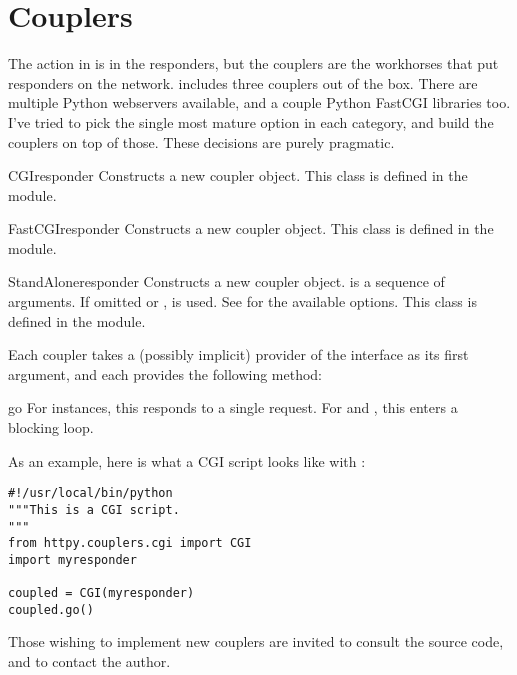 \section{Couplers \label{couplers}}

The action in  is in the responders, but the couplers are the
workhorses that put responders on the network.  includes three
couplers out of the box. There are multiple Python webservers available, and a
couple Python FastCGI libraries too. I've tried to pick the single most mature
option in each category, and build the couplers on top of those. These decisions
are purely pragmatic.

\begin{classdesc}{CGI}{responder} Constructs a new  coupler object.
This class is defined in the  module.
\end{classdesc}

\begin{classdesc}{FastCGI}{responder} Constructs a new  coupler
object. This class is defined in the  module.
\end{classdesc}

\begin{classdesc}{StandAlone}{responder} Constructs a new
 coupler object.  is a sequence of arguments. If
omitted or ,  is used. See  for the available options. This class
is defined in the  module. \end{classdesc}

Each coupler takes a (possibly implicit) provider of the 
interface as its first argument, and each provides the following method:

\begin{methoddesc}{go}{} For  instances, this responds to a single
request. For  and , this enters a blocking
loop.\end{methoddesc}

As an example, here is what a CGI script looks like with :

\begin{verbatim}
#!/usr/local/bin/python
"""This is a CGI script.
"""
from httpy.couplers.cgi import CGI
import myresponder

coupled = CGI(myresponder)
coupled.go()
\end{verbatim}

Those wishing to implement new couplers are invited to consult the source code,
and to contact the author.